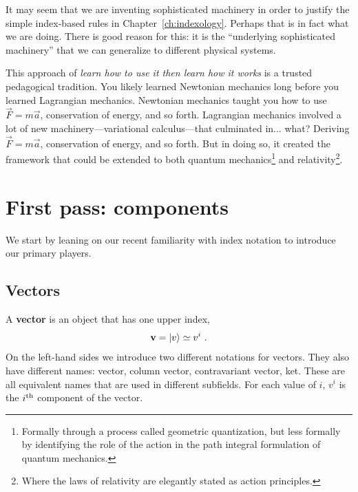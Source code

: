 \documentclass[12pt, oneside]{report}    %
\let\oldsection\section
\def\section{%
  \setcounter{sidenote}{1}%
  \oldsection
}
\begin{document}
It may seem that we are inventing sophisticated machinery in order to justify the simple index-based rules in Chapter~\ref{ch:indexology}. Perhaps that is in fact what we are doing. There is good reason for this: it is the ``underlying sophisticated machinery'' that we can generalize to different physical systems.

\begin{example}
This approach of \emph{learn how to use it then learn how it works} is a trusted pedagogical tradition. You likely learned Newtonian mechanics long before you learned Lagrangian mechanics. Newtonian mechanics taught you how to use $\vec{F} = m\vec{a}$, conservation of energy, and so forth. Lagrangian mechanics involved a lot of new machinery---variational calculus---that culminated in... what? Deriving $\vec{F}=m\vec{a}$, conservation of energy, and so forth. But in doing so, it created the framework that could be extended to both quantum mechanics\footnote{Formally through a process called geometric quantization, but less formally by identifying the role of the action in the path integral formulation of quantum mechanics.} and relativity\footnote{Where the laws of relativity are elegantly stated as action principles.}.
\end{example} 

\section{First pass: components}
\label{sec:component:notation}

We start by leaning on our recent familiarity with index notation to introduce our primary players.

\subsection{Vectors}

A \textbf{vector} is an object that has one upper index,
\begin{align}
    \mathbf{v} = \left|v\right\rangle \simeq v^i \ .
\end{align}
On the left-hand sides we introduce two different notations for vectors. They also have different names: vector, column vector, contravariant vector, ket. These are all equivalent names that are used in different subfields. For each value of $i$, $v^i$ is the $i^\textnormal{th}$ component of the vector. 
\end{document}
